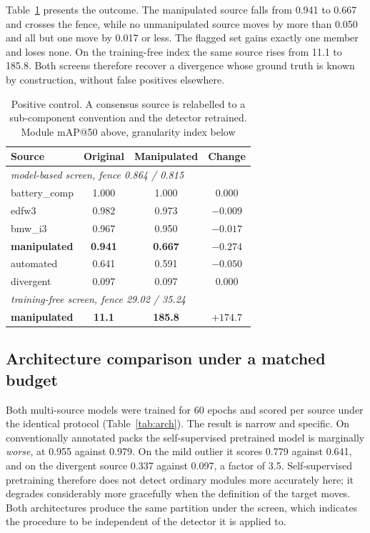 \documentclass[conference]{IEEEtran}
\begin{document}
Table~\ref{tab:control} presents the outcome. The manipulated source falls from 0.941
to 0.667 and crosses the fence, while no unmanipulated source moves by more than
0.050 and all but one move by 0.017 or less. The flagged set gains exactly one member and
loses none. On the training-free index the same source rises from 11.1 to 185.8. Both
screens therefore recover a divergence whose ground truth is known by construction,
without false positives elsewhere.

\begin{table}[t]
\caption{Positive control. A consensus source is relabelled to a sub-component
convention and the detector retrained. Module mAP@50 above, granularity index below}
\label{tab:control}
\centering\small
\setlength{\tabcolsep}{4pt}
\begin{tabular}{lccc}
\toprule
Source & Original & Manipulated & Change \\
\midrule
\multicolumn{4}{l}{\emph{model-based screen, fence 0.864 / 0.815}} \\
battery\_comp & 1.000 & 1.000 & $0.000$ \\
edfw3 & 0.982 & 0.973 & $-0.009$ \\
bmw\_i3 & 0.967 & 0.950 & $-0.017$ \\
\textbf{manipulated} & \textbf{0.941} & \textbf{0.667} & $\mathbf{-0.274}$ \\
automated & 0.641 & 0.591 & $-0.050$ \\
divergent & 0.097 & 0.097 & $0.000$ \\
\midrule
\multicolumn{4}{l}{\emph{training-free screen, fence 29.02 / 35.24}} \\
\textbf{manipulated} & \textbf{11.1} & \textbf{185.8} & $\mathbf{+174.7}$ \\
\bottomrule
\end{tabular}
\end{table}

\subsection{Architecture comparison under a matched budget}
\label{sec:res-arch}
Both multi-source models were trained for 60 epochs and scored per source under the
identical protocol (Table~\ref{tab:arch}). The result is narrow and specific. On
conventionally annotated packs the self-supervised pretrained model is marginally
\emph{worse}, at 0.955 against 0.979. On the mild outlier it scores 0.779 against
0.641, and on the divergent source 0.337 against 0.097, a factor of 3.5.
Self-supervised pretraining therefore does not detect ordinary modules more accurately
here; it degrades considerably more gracefully when the definition of the target
moves. Both architectures produce the same partition under the screen, which indicates
the procedure to be independent of the detector it is applied to.
\end{document}
